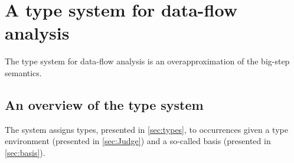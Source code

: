 \documentclass{llncs}
\newcommand{\sqleq}{\ensuremath{\sqsubseteq\xspace}}
\begin{document}
\iffalse
\begin{example}[Data-flow for abstractions]\label{ex:DFAbs}
The following program creates a local binding to the identity function and applies it twice.

\begin{lstlisting}[language=Caml, mathescape=true]
(let x ($\lambda$ y.(y$^1$))$^2$ (let z (x$^3$ 1$^4$)$^5$ (x$^6$ 2$^7$)$^{8}$)$^{9}$)$^{10}$
\end{lstlisting}
The transition tree can be found in \cref{FigEx.Abs}.
In the transition tree, we see that $\psi$ is extended a couple of times, where we will take a look at a couple of interesting extensions to $\psi$
The first time we evaluate the abstraction body, $\psi$ is on the following form:

$$\psi_2=(w_2=[x^{2}\mapsto(\emptyset,\emptyset), y^{4}\mapsto(\emptyset,\emptyset)],\sqleq_w^2=\emptyset)$$
Here, the lookup of the parameter $y$ is simple, as there are only one occurrence, where we then know that $inf_{\psi_2}(y)=4$.

The second time we evaluate the body of the abstraction, $\psi$ is 
%
\[ \psi_3=(w_3=[x^{2}\mapsto(\emptyset,\emptyset),
  y^{4}\mapsto(\emptyset,\emptyset),
  y^{7}\mapsto(\emptyset,\emptyset)],\sqleq_w^2=\{4,7\}) \]
Here, we now have two bindings for the parameter $y$, but since we also know that there are an ordering for the two occurrences of $y$, we then know that the program point $7$ is evaluated after $4$, as such we know that $inf_{\psi_3}(y)=7$.
\end{example}

\begin{landscape}

\end{landscape}
\fi

\section{A type system for data-flow analysis}\label{sec:TypeSys}

The type system for data-flow analysis is an overapproximation of
the big-step semantics.

\subsection{An overview of the type system}

The system assigns types, presented in \cref{sec:types}, to
occurrences given a type environment (presented in
\cref{sec:Judge}) and a so-called basis (presented in
\cref{sec:basis}).
\end{document}
